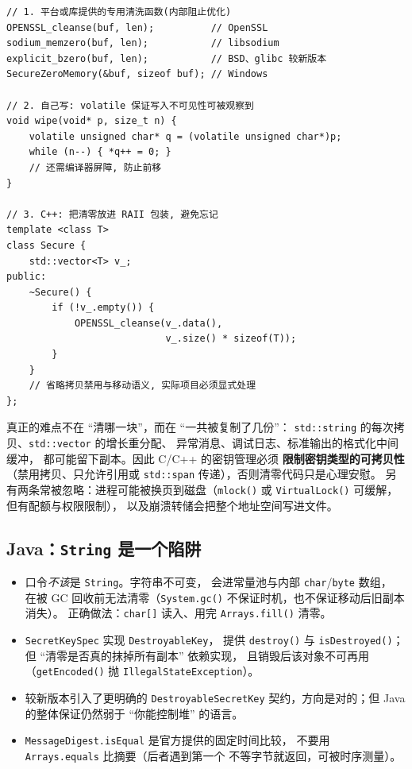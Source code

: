 \documentclass[12pt,a4paper,fontset=fandol]{ctexbook}
\newcommand{\Fn}[1]{\texttt{#1()}}
\newcommand{\Tp}[1]{\texttt{#1}}
\newcommand{\CppJava}{C/C++}
\begin{document}
\begin{lstlisting}[caption={C/C++：清零的三种可移植写法}]
// 1. 平台或库提供的专用清洗函数(内部阻止优化)
OPENSSL_cleanse(buf, len);          // OpenSSL
sodium_memzero(buf, len);           // libsodium
explicit_bzero(buf, len);           // BSD、glibc 较新版本
SecureZeroMemory(&buf, sizeof buf); // Windows

// 2. 自己写: volatile 保证写入不可见性可被观察到
void wipe(void* p, size_t n) {
    volatile unsigned char* q = (volatile unsigned char*)p;
    while (n--) { *q++ = 0; }
    // 还需编译器屏障, 防止前移
}

// 3. C++: 把清零放进 RAII 包装, 避免忘记
template <class T>
class Secure {
    std::vector<T> v_;
public:
    ~Secure() {
        if (!v_.empty()) {
            OPENSSL_cleanse(v_.data(),
                            v_.size() * sizeof(T));
        }
    }
    // 省略拷贝禁用与移动语义, 实际项目必须显式处理
};
\end{lstlisting}

真正的难点不在 ``清哪一块''，而在 ``一共被复制了几份''：
\Tp{std::string} 的每次拷贝、\Tp{std::vector} 的增长重分配、
异常消息、调试日志、标准输出的格式化中间缓冲，
都可能留下副本。因此 \CppJava{} 的密钥管理必须
\textbf{限制密钥类型的可拷贝性}（禁用拷贝、只允许引用或
\Tp{std::span} 传递），否则清零代码只是心理安慰。
另有两条常被忽略：进程可能被换页到磁盘（\Fn{mlock} 或
\Fn{VirtualLock} 可缓解，但有配额与权限限制），
以及崩溃转储会把整个地址空间写进文件。

\subsection{Java：\Tp{String} 是一个陷阱}

\begin{itemize}
  \item 口令\emph{不该}是 \Tp{String}。字符串不可变，
        会进常量池与内部 \Tp{char}/\allowbreak{}\Tp{byte} 数组，
        在被 GC 回收前无法清零（\Tp{System.gc()}
        不保证时机，也不保证移动后旧副本消失）。
        正确做法：\Tp{char[]} 读入、用完 \Fn{Arrays.fill} 清零。
  \item \Tp{SecretKeySpec} 实现 \Tp{DestroyableKey}，
        提供 \Fn{destroy} 与 \Fn{isDestroyed}；
        但 ``清零是否真的抹掉所有副本'' 依赖实现，
        且销毁后该对象不可再用（\Fn{getEncoded} 抛
        \Tp{IllegalStateException}）。
  \item 较新版本引入了更明确的 \Tp{Destroyable\allowbreak SecretKey}
        契约，方向是对的；但 Java 的整体保证仍然弱于
        ``你能控制堆'' 的语言。
  \item \Tp{MessageDigest.\allowbreak isEqual} 是官方提供的固定时间比较，
        不要用 \Tp{Arrays.equals} 比摘要（后者遇到第一个
        不等字节就返回，可被时序测量）。
\end{itemize}
\end{document}
